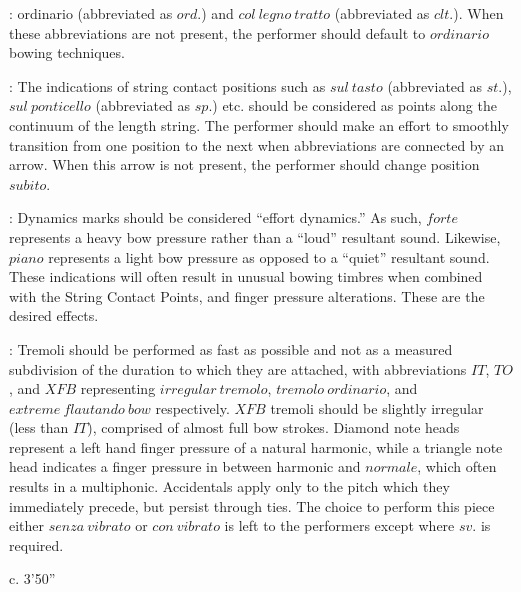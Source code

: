 \documentclass[11pt]{article}
\newcommand*\circled[1]{\tikz[baseline=(char.base)]{
            \node[shape=circle,draw,inner sep=1pt] (char) {#1};}}
\begin{document}
\begingroup
\begin{center}
 : \circled{1} ordinario (abbreviated as $ord.$) and \circled{2} $col \ legno \ tratto$ (abbreviated as $clt.$). When these abbreviations are not present, the performer should default to $ordinario$ bowing techniques.
\rightskip\leftskip
\phantom{text} \hfill \phantom{()}

 : The indications of string contact positions such as $sul \ tasto$ (abbreviated as $st.$), $sul \ ponticello$ (abbreviated as $sp.$) etc. should be considered as points along the continuum of the length string. The performer should make an effort to smoothly transition from one position to the next when abbreviations are connected by an arrow. When this arrow is not present, the performer should change position $subito$.
\rightskip\leftskip
\phantom{text} \hfill \phantom{()}

 : Dynamics marks should be considered ``effort dynamics.'' As such, $forte$ represents a heavy bow pressure rather than a ``loud'' resultant sound. Likewise, $piano$ represents a light bow pressure as opposed to a ``quiet'' resultant sound. These indications will often result in unusual bowing timbres when combined with the String Contact Points, and finger pressure alterations. These are the desired effects.
\rightskip\leftskip
\phantom{text} \hfill \phantom{()}

 : \circled{1} Tremoli should be performed as fast as possible and not as a measured subdivision of the duration to which they are attached, with abbreviations $IT$, $TO$, and $XFB$ representing $irregular \ tremolo$, $tremolo \ ordinario$, and $extreme \ flautando \ bow$ respectively. $XFB$ tremoli should be slightly irregular (less than $IT$), comprised of almost full bow strokes. \circled{2} Diamond note heads represent a left hand finger pressure of a natural harmonic, \circled{3} while a triangle note head indicates a finger pressure in between harmonic and $normale$, which often results in a multiphonic. \circled{4} Accidentals apply only to the pitch which they immediately precede, but persist through ties. \circled{5} The choice to perform this piece either $senza \ vibrato$ or $con \ vibrato$ is left to the performers except where $sv.$ is required.
\rightskip\leftskip
\phantom{text} \hfill \phantom{()}
\end{center}
\endgroup

\vspace*{17\baselineskip}

\begin{center}
c. 3'50''
\end{center}

\vspace*{27\baselineskip}
\end{document}
